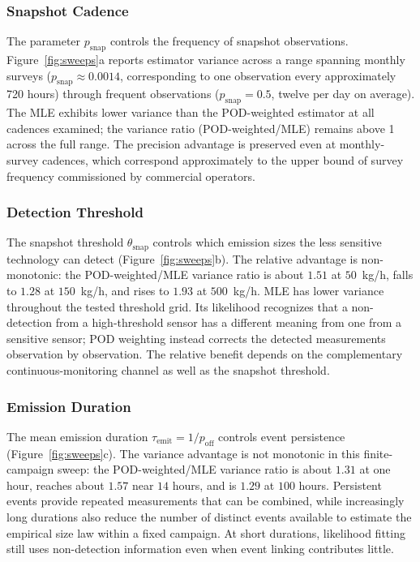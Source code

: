 \documentclass[numsec,webpdf,modern,mediumone]{oup-authoring-template}
\newcommand{\new}[1]{#1}
\begin{document}
\subsubsection{Snapshot Cadence}
\new{The parameter $p_{\text{snap}}$ controls the frequency of snapshot observations. Figure~\ref{fig:sweeps}a reports estimator variance across a range spanning monthly surveys ($p_{\text{snap}} \approx 0.0014$, corresponding to one observation every approximately 720 hours) through frequent observations ($p_{\text{snap}} = 0.5$, twelve per day on average). The MLE exhibits lower variance than the POD-weighted estimator at all cadences examined; the variance ratio (POD-weighted/MLE) remains above 1 across the full range. %
The precision advantage is preserved even at monthly-survey cadences, which correspond approximately to the upper bound of survey frequency commissioned by commercial operators.}

\subsubsection{Detection Threshold}

The snapshot threshold $\theta_{\text{snap}}$ controls which emission sizes the less sensitive technology can detect (Figure~\ref{fig:sweeps}b). The relative advantage is non-monotonic: the POD-weighted/MLE variance ratio is about $1.51$ at $50$~kg/h, falls to $1.28$ at $150$~kg/h, and rises to $1.93$ at $500$~kg/h. MLE has lower variance throughout the tested threshold grid. Its likelihood recognizes that a non-detection from a high-threshold sensor has a different meaning from one from a sensitive sensor; POD weighting instead corrects the detected measurements observation by observation. The relative benefit depends on the complementary continuous-monitoring channel as well as the snapshot threshold.

\subsubsection{Emission Duration}

The mean emission duration $\tau_\text{emit}=1/p_{\text{off}}$ controls event persistence (Figure~\ref{fig:sweeps}c). The variance advantage is not monotonic in this finite-campaign sweep: the POD-weighted/MLE variance ratio is about $1.31$ at one hour, reaches about $1.57$ near $14$ hours, and is $1.29$ at $100$ hours. Persistent events provide repeated measurements that can be combined, while increasingly long durations also reduce the number of distinct events available to estimate the empirical size law within a fixed campaign. At short durations, likelihood fitting still uses non-detection information even when event linking contributes little.
\end{document}
